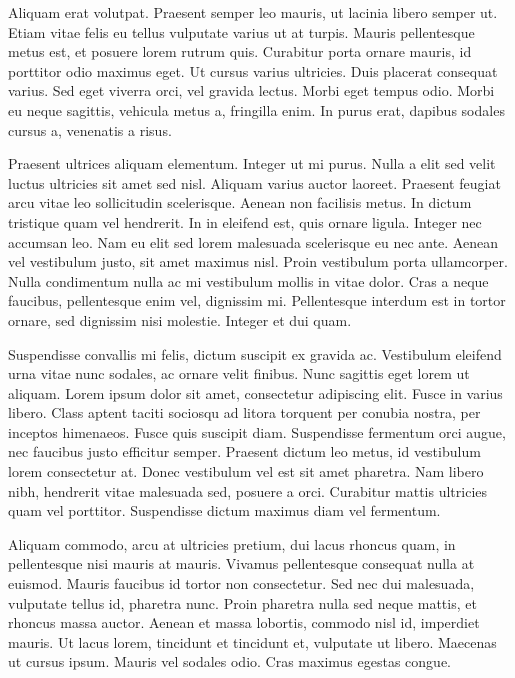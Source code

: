 Aliquam erat volutpat. Praesent semper leo mauris, ut lacinia libero semper ut. Etiam vitae felis eu tellus vulputate varius ut at turpis. Mauris pellentesque metus est, et posuere lorem rutrum quis. Curabitur porta ornare mauris, id porttitor odio maximus eget. Ut cursus varius ultricies. Duis placerat consequat varius. Sed eget viverra orci, vel gravida lectus. Morbi eget tempus odio. Morbi eu neque sagittis, vehicula metus a, fringilla enim. In purus erat, dapibus sodales cursus a, venenatis a risus.

Praesent ultrices aliquam elementum. Integer ut mi purus. Nulla a elit sed velit luctus ultricies sit amet sed nisl. Aliquam varius auctor laoreet. Praesent feugiat arcu vitae leo sollicitudin scelerisque. Aenean non facilisis metus. In dictum tristique quam vel hendrerit. In in eleifend est, quis ornare ligula. Integer nec accumsan leo. Nam eu elit sed lorem malesuada scelerisque eu nec ante. Aenean vel vestibulum justo, sit amet maximus nisl. Proin vestibulum porta ullamcorper. Nulla condimentum nulla ac mi vestibulum mollis in vitae dolor. Cras a neque faucibus, pellentesque enim vel, dignissim mi. Pellentesque interdum est in tortor ornare, sed dignissim nisi molestie. Integer et dui quam.

Suspendisse convallis mi felis, dictum suscipit ex gravida ac. Vestibulum eleifend urna vitae nunc sodales, ac ornare velit finibus. Nunc sagittis eget lorem ut aliquam. Lorem ipsum dolor sit amet, consectetur adipiscing elit. Fusce in varius libero. Class aptent taciti sociosqu ad litora torquent per conubia nostra, per inceptos himenaeos. Fusce quis suscipit diam. Suspendisse fermentum orci augue, nec faucibus justo efficitur semper. Praesent dictum leo metus, id vestibulum lorem consectetur at. Donec vestibulum vel est sit amet pharetra. Nam libero nibh, hendrerit vitae malesuada sed, posuere a orci. Curabitur mattis ultricies quam vel porttitor. Suspendisse dictum maximus diam vel fermentum.

Aliquam commodo, arcu at ultricies pretium, dui lacus rhoncus quam, in pellentesque nisi mauris at mauris. Vivamus pellentesque consequat nulla at euismod. Mauris faucibus id tortor non consectetur. Sed nec dui malesuada, vulputate tellus id, pharetra nunc. Proin pharetra nulla sed neque mattis, et rhoncus massa auctor. Aenean et massa lobortis, commodo nisl id, imperdiet mauris. Ut lacus lorem, tincidunt et tincidunt et, vulputate ut libero. Maecenas ut cursus ipsum. Mauris vel sodales odio. Cras maximus egestas congue.

